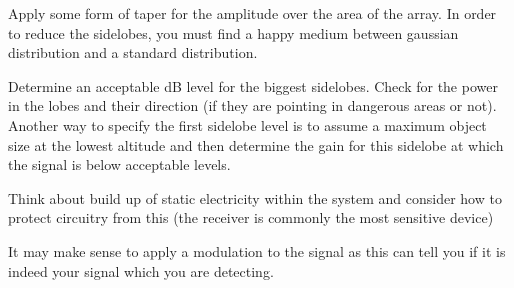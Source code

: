 \documentclass[11pt]{witseiepaper}
\begin{document}
Apply some form of taper for the amplitude over the area of the array.
In order to reduce the sidelobes, you must find a happy medium between gaussian distribution and a standard distribution.

Determine an acceptable dB level for the biggest sidelobes. Check for the power in the lobes and their direction (if they are pointing in dangerous areas or not). Another way to specify the first sidelobe level is to assume a maximum object size at the lowest altitude and then determine the gain for this sidelobe at which the signal is below acceptable levels.

Think about build up of static electricity within the system and consider how to protect circuitry from this (the receiver is commonly the most sensitive device)

It may make sense to apply a modulation to the signal as this can tell you if it is indeed your signal which you are detecting.




%




\end{document}

